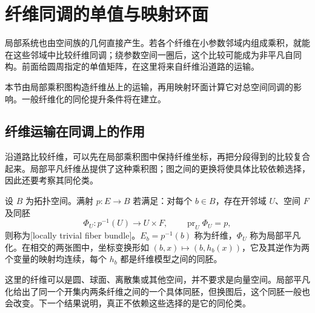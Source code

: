
% 
% 
% 

\section{纤维同调的单值与映射环面}
\label{g2:sec:0504}

局部系统也由空间族的几何直接产生。若各个纤维在小参数邻域内组成乘积，就能在这些邻域中比较纤维同调；绕参数空间一圈后，这个比较可能成为非平凡自同构。前面给圆周指定的单值矩阵，在这里将来自纤维沿道路的运输。

\ProseParagraphBreak

本节由局部乘积图构造纤维丛上的运输，再用映射环面计算它对总空间同调的影响。一般纤维化的同伦提升条件将在建立。

\subsection{纤维运输在同调上的作用}
\label{g2:subsec:0504:01}
沿道路比较纤维，可以先在局部乘积图中保持纤维坐标，再把分段得到的比较复合起来。局部平凡纤维丛提供了这种乘积图；图之间的更换将使具体比较依赖选择，因此还要考察其同伦类。

\begin{definition}[局部平凡纤维丛]\label{g2:def:topological-fiber-bundle}
	设 \(B\) 为拓扑空间。满射 \(p:E\to B\) 若满足：对每个 \(b\in B\)，存在开邻域 \(U\)、空间 \(F\) 及同胚
	\[
		\Phi_U:p^{-1}(U)\longrightarrow U\times F,
		\qquad\operatorname{pr}_U\Phi_U=p,
	\]
	则称为[locally trivial fiber bundle]。\(E_b=p^{-1}(b)\) 称为纤维，\(\Phi_U\) 称为局部平凡化。在相交的两张图中，坐标变换形如 \((b,x)\mapsto(b,h_b(x))\)，它及其逆作为两个变量的映射均连续，每个 \(h_b\) 都是纤维模型之间的同胚。
\end{definition}

这里的纤维可以是圆、球面、离散集或其他空间，并不要求是向量空间。局部平凡化给出了同一个开集内两条纤维之间的一个具体同胚，但换图后，这个同胚一般也会改变。下一个结果说明，真正不依赖这些选择的是它的同伦类。

